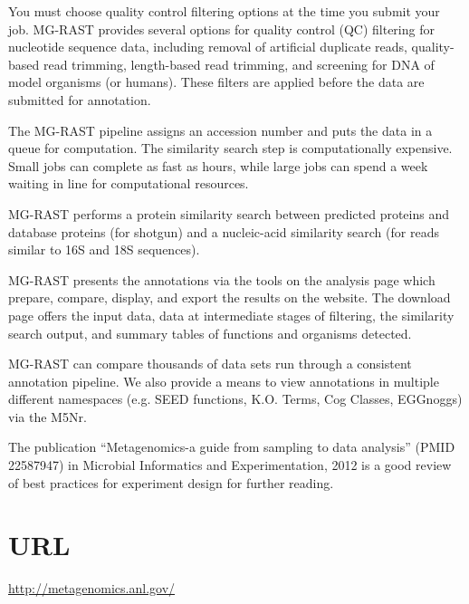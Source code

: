 \documentclass[12pt,fullpage]{report}
\begin{document}
You must choose quality control filtering options at the time you submit your job. MG-RAST provides several options for  quality control (QC) filtering for nucleotide sequence data, including  removal of artificial duplicate reads, quality-based read trimming, length-based read trimming, and screening for DNA of model organisms (or humans). These filters are applied before the data are submitted for annotation.

The MG-RAST pipeline assigns an accession number and puts the data in a queue for computation.  The similarity search step is computationally expensive. Small jobs can complete as fast as hours, while large jobs can spend a week waiting in line for computational resources.

MG-RAST performs a protein similarity search between predicted proteins and database proteins (for shotgun) and a nucleic-acid similarity search (for reads similar to 16S and 18S sequences). 

MG-RAST presents the annotations via the tools on the analysis page which prepare, compare, display, and export the results on the website. The download page offers the input data, data at intermediate stages of filtering, the similarity search output, and summary tables of functions and organisms detected.

MG-RAST can compare thousands of data sets run through a consistent annotation pipeline.  We also provide a means to view annotations in multiple different namespaces (e.g. SEED functions, K.O. Terms, Cog Classes, EGGnoggs) via the M5Nr.

The publication ``Metagenomics-a guide from sampling to data analysis'' (PMID 22587947) in Microbial Informatics and Experimentation, 2012 is a good review of best practices for experiment design for further reading.
\section{URL}
\label{section:MG-RAST-URL}
\url{http://metagenomics.anl.gov/}
\end{document}
